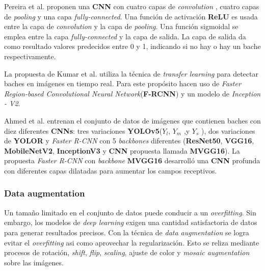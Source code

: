 	Pereira et al. proponen una \textbf{CNN} con cuatro capas de \emph{convolution} , cuatro
	capas de \emph{pooling} y una capa \emph{fully-connected}. Una función de activación \textbf{ReLU} es usada entre 
	la capa de \emph{convolution} y la capa de \emph{pooling}. Una función sigmoidal se emplea entre la capa \emph{fully-connected}
	y la capa de salida. La capa de salida da como resultado  valores predecidos entre 0 y 1, indicando si no hay o hay un bache respectivamente.
	
	La propuesta de Kumar et al. utiliza la técnica de \emph{transfer learning} para detectar baches en imágenes 
	en tiempo real. Para este propósito hacen uso de \emph{Faster Region-based Convolutional Neural Network}(\textbf{F-RCNN}) y un modelo de
	\emph{Inception - V2}. 
	
	Ahmed et al. entrenan el conjunto de datos de imágenes que contienen baches con diez diferentes 
	\textbf{CNNs}: tres variaciones  \textbf{YOLOv5}($Y_l$, $Y_m$ ,y $Y_s$ ), dos variaciones de \textbf{YOLOR} y \emph{Faster R-CNN} 
	con 5 \emph{backbones} diferentes (\textbf{ResNet50}, \textbf{VGG16}, \textbf{MobileNetV2}, \textbf{InceptionV3}  y  \textbf{CNN} 
	propuesta llamada  \textbf{MVGG16}). La propuesta \emph{Faster R-CNN} con \emph{backbone} \textbf{MVGG16} desarrolló una 
	\textbf{CNN} profunda con diferentes capas dilatadas para aumentar los campos receptivos.

		\subsubsection{Data augmentation}
			Un tamaño limitado en el conjunto de datos puede conducir a un \emph{overfitting}. Sin embargo, los modelos de \emph{deep learning}
			exigen una cantidad satisfactoria de datos para generar resultados precisos. Con la técnica de \emph{data augmentation} se logra evitar 
			el \emph{overfitting} asi como aprovechar la regularización. 
			Esto se reliza mediante procesos de rotación, \emph{shift}, 
			\emph{flip}, \emph{scaling}, ajuste de color y 
			\emph{mosaic augmentation} sobre las imágenes.

